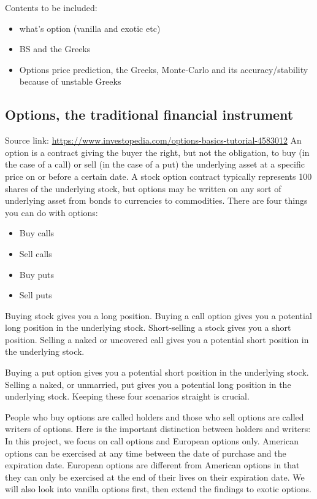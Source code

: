 \documentclass{report}
\begin{document}
Contents to be included:
\begin{itemize}
\item what's option (vanilla and exotic etc)
\item BS and the Greeks
\item Options price prediction, the Greeks, Monte-Carlo and its accuracy/stability because of unstable Greeks
\end{itemize}


\subsection{Options, the traditional financial instrument}
Source link: \url {https://www.investopedia.com/options-basics-tutorial-4583012}\newline
An option is a contract giving the buyer the right, but not the obligation, to buy (in the case of a call) or sell (in the case of a put) the underlying asset at a specific price on or before a certain date.
A stock option contract typically represents 100 shares of the underlying stock, but options may be written on any sort of underlying asset from bonds to currencies to commodities.
There are four things you can do with options:
\begin{itemize}
\item Buy calls
\item Sell calls
\item Buy puts
\item Sell puts
\end{itemize}
Buying stock gives you a long position. Buying a call option gives you a potential long position in the underlying stock. Short-selling a stock gives you a short position. Selling a naked or uncovered call gives you a potential short position in the underlying stock.

Buying a put option gives you a potential short position in the underlying stock. Selling a naked, or unmarried, put gives you a potential long position in the underlying stock. Keeping these four scenarios straight is crucial.

People who buy options are called holders and those who sell options are called writers of options. Here is the important distinction between holders and writers:
In this project, we focus on call options and European options only. American options can be exercised at any time between the date of purchase and the expiration date. European options are different from American options in that they can only be exercised at the end of their lives on their expiration date.
We will also look into vanilla options first, then extend the findings to exotic options. 
\end{document}
